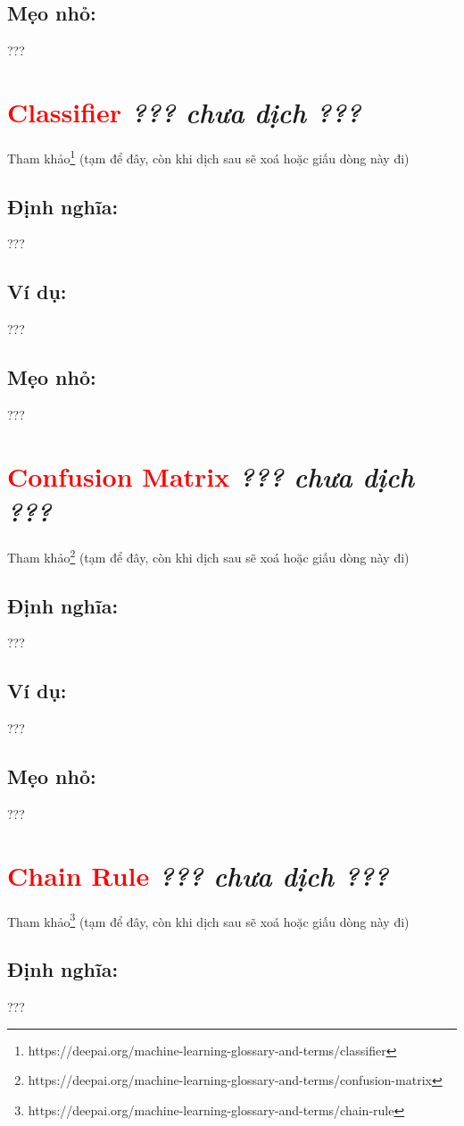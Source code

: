 \subsection*{Mẹo nhỏ:}
???
\section*{\huge \textcolor{Red}{Classifier}  \small \textit{??? chưa dịch ???} }
Tham khảo\footnote{https://deepai.org/machine-learning-glossary-and-terms/classifier} (tạm để đây, còn khi dịch sau sẽ xoá hoặc giấu dòng này đi)
\subsection*{Định nghĩa:}
???
\subsection*{Ví dụ:}
???
\subsection*{Mẹo nhỏ:}
???
\section*{\huge \textcolor{Red}{Confusion Matrix}  \small \textit{??? chưa dịch ???} }
Tham khảo\footnote{https://deepai.org/machine-learning-glossary-and-terms/confusion-matrix} (tạm để đây, còn khi dịch sau sẽ xoá hoặc giấu dòng này đi)
\subsection*{Định nghĩa:}
???
\subsection*{Ví dụ:}
???
\subsection*{Mẹo nhỏ:}
???
\section*{\huge \textcolor{Red}{Chain Rule}  \small \textit{??? chưa dịch ???} }
Tham khảo\footnote{https://deepai.org/machine-learning-glossary-and-terms/chain-rule} (tạm để đây, còn khi dịch sau sẽ xoá hoặc giấu dòng này đi)
\subsection*{Định nghĩa:}
???
